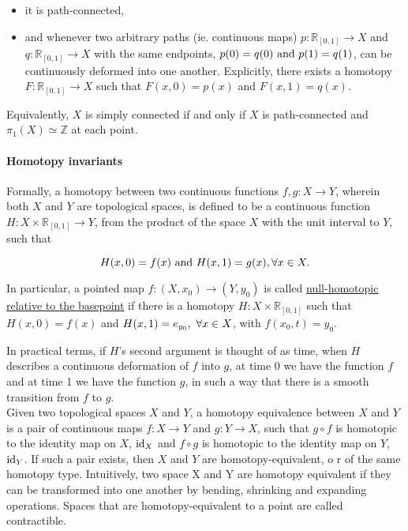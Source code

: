 \documentclass{homework}
\begin{document}
\begin{itemize}
    \item it is path-connected,
    \item and whenever two arbitrary paths (ie. continuous maps) $p: \mathds{R}_{[0,1]} \to X$ and $q: \mathds{R}_{[0,1]} \to X$ with the same endpoints, $p(0) = q(0) \textnormal{ and } p(1) = q(1)$, can be continuously deformed into one another. Explicitly, there exists a homotopy $F: \mathds{R}_{[0,1]} \to X$ such that $F(x,0) = p(x)$ and $F(x,1) = q(x)$. \\
\end{itemize}

Equivalently, $X$ is simply connected if and only if $X$ is path-connected and $\pi_1 (X) \simeq \mathds{Z}$ at each point. \\

\paragraph{\textbf{Homotopy invariants}}

Formally, a homotopy between two continuous functions $f, g: X \to Y$, wherein both $X$ and $Y$ are topological spaces, is defined to be a continuous function $H: X \times \mathds{R}_{[0,1]} \to Y$, from the product of the space $X$ with the unit interval to $Y$, such that 

$$
    H(x,0) = f(x) \textnormal{ and } H(x, 1) = g(x), \forall x \in X.
$$

In particular, a pointed map $f: (X, x_0) \rightarrow (Y, y_0)$ is called \underline{null-homotopic relative to the basepoint} if there is a homotopy $H: X\times \mathds{R}_{[0,1]}$ such that $H(x,0) = f(x)$ and $H(x, 1) = e_{y_0}, \textnormal{ } \forall x \in X$, with $f(x_0, t) = y_0$.

In practical terms, if $H$'s second argument is thought of as time, when $H$ describes a continuous deformation of $f$ into $g$, at time 0 we have the function $f$ and at time 1 we have the function $g$, in such a way that there is a smooth transition from $f$ to $g$. \\

Given two topological spaces $X$ and $Y$, a homotopy equivalence between $X$ and $Y$ is a pair of continuous maps $f: X \to Y$ and $g: Y \to X$, such that $ g \circ f $ is homotopic to the identity map on $X$, $\textnormal{id}_X$ and $ f \circ g $ is homotopic to the identity map on $Y$, $\textnormal{id}_Y$. If such a pair exists, then $X$ and $Y$ are homotopy-equivalent, o r of the same homotopy type. Intuitively, two space X and Y are homotopy equivalent if they can be transformed into one another by bending, shrinking and expanding operations. Spaces that are homotopy-equivalent to a point are called contractible.
\end{document}
